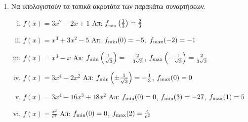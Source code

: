 


\everymath{\displaystyle}



\begin{center}
\end{center}

\thispagestyle{empty}
\vspace{\baselineskip}

\begin{enumerate}
    \item Να υπολογιστούν τα τοπικά ακροτάτα των παρακάτω συναρτήσεων.

        \begin{enumerate}[i)]
        \renewcommand{\itemsep}{15pt}
            \item $ f(x) = 3x^{2}-2x+1 $ 
                \hfill Απ: $ f_{\rm_{min}}\left(\frac{1}{3} \right) = \frac{2}{3} $ 
            \item $ f(x) = x^{3}+3x^{2}-5 $ 
                \hfill Απ: $ f_{\rm min}(0) = -5 $, $ f_{\rm max}(-2) = -1 $ 
            \item $ f(x) = x^{3} - x $ 
                \hfill Απ: $ f_{\rm min}\left(\frac{1}{\sqrt{3}} \right) 
                = - \frac{2}{3 \sqrt{3}} $, $ f_{\rm max} \left(-\frac{1}{\sqrt{3}} 
                \right) = \frac{2}{3 \sqrt{3}} $
            \item $ f(x) = 3x^{4} - 2x^{2} $ 
                \hfill Απ: $ f_{\rm min}\left(\pm \frac{1}{\sqrt{3}}\right) 
                = - \frac{1}{3} $, $ f_{\rm max}(0) = 0 $
            \item $ f(x) = 3x^{4} -16x^{3}+18x^{2} $ 
                \hfill Απ: $ f_{\rm min}(0)=0 $, $ f_{\rm min}(3)
                =-27 $, $ f_{\rm max}(1) = 5 $ 
            \item $ f(x) = \frac{x^{2}}{e^{x}} $
                 \hfill Απ: $ f_{\rm min}(0) = 0 $, $f_{\rm max}(2) = \frac{4}{e^{2}} $ 
        \end{enumerate}

\end{enumerate}




